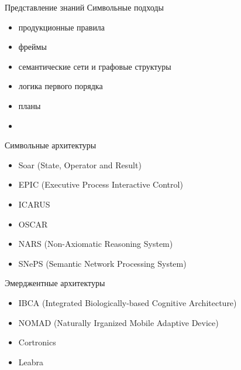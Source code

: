 \documentclass{beamer}
\begin{document}
\begin{frame}{Представление знаний}
Символьные подходы\\
\medskip
\begin{itemize}
	\item продукционные правила
	\item фреймы
	\item семантические сети и графовые структуры
	\item логика первого порядка
	\item планы
	\medskip
\end{itemize}
\end{frame}

\begin{frame}{}
\begin{itemize}
	\item 
	\medskip
\end{itemize}
\end{frame}

\begin{frame}{Символьные архитектуры}
\begin{itemize}
	\item Soar (State, Operator and Result)
	\item EPIC (Executive Process Interactive Control)
	\item ICARUS
	\item OSCAR
	\item NARS (Non-Axiomatic Reasoning System)
	\item SNePS (Semantic Network Processing System)
\end{itemize}
\end{frame}

\begin{frame}{Эмерджентные архитектуры}
\begin{itemize}
	\item IBCA (Integrated Biologically-based Cognitive Architecture)
	\item NOMAD (Naturally Irganized Mobile Adaptive Device)
	\item Cortronics
	\item Leabra
\end{itemize}
\end{frame}
\end{document}
